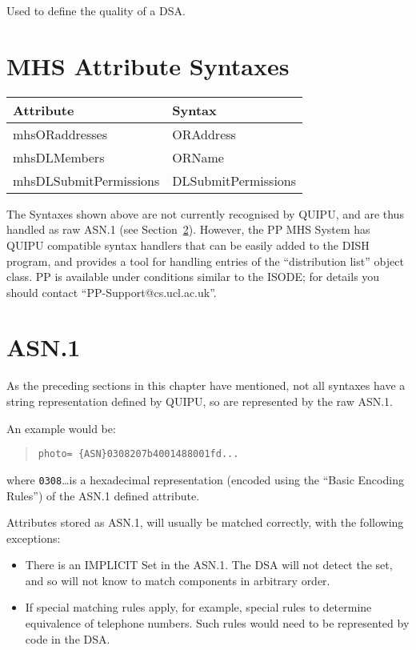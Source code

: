Used to define the quality of a DSA.

\section{MHS Attribute Syntaxes}

\begin{center}\small
\begin{tabular}{|l|l|}
\hline
Attribute & Syntax \\ 
\hline
mhsORaddresses & ORAddress \\
mhsDLMembers & ORName \\
mhsDLSubmitPermissions & DLSubmitPermissions \\
\hline
\end{tabular}
\end{center}

The Syntaxes shown above are not currently recognised by QUIPU,
and are thus handled as raw ASN.1 (see Section~\ref{ASN_syntax}).
However, the PP MHS System has QUIPU compatible syntax
handlers that can be easily added to the DISH program, and
provides a tool for handling entries of the ``distribution list''
object class.
PP is available under conditions similar to the ISODE; for details 
you should contact ``PP-Support@cs.ucl.ac.uk''.



\section{ASN.1}
\label{ASN_syntax}
As the preceding sections in this chapter have mentioned, not all syntaxes
have a string representation defined by QUIPU, so are represented by the raw
ASN.1.

An example would be:
\begin{quote}\begin{verbatim}
photo= {ASN}0308207b4001488001fd...
\end{verbatim}\end{quote}
where \verb+0308+\ldots is a hexadecimal representation (encoded using the
``Basic Encoding Rules'') of the ASN.1 defined attribute.

Attributes stored as ASN.1, will usually be matched correctly, with
the following exceptions:

\begin{itemize}
\item
There is an IMPLICIT Set in the ASN.1.  The DSA will not detect the
set, and so will not know to match components in arbitrary order.

\item
If special matching rules apply, for example, special rules to
determine equivalence of telephone numbers.  Such rules would need
to be represented by code in the DSA.
\end{itemize}

